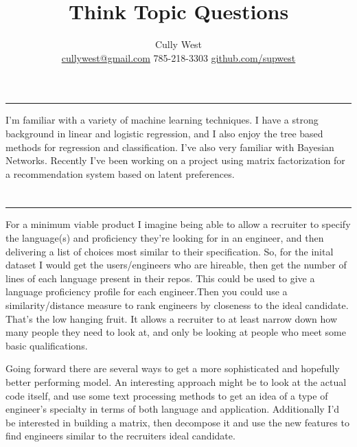 \documentclass{article}
\begin{document}
\vspace{-10pt}
\title{Think Topic Questions}
\author{{Cully West} \\ \faEnvelope \hspace{2pt} \href{cullywest@gmail.com}{cullywest@gmail.com}\hspace{2pt} \faPhone \hspace{2pt} 785-218-3303 \faGithub\hspace{2pt}\href{https://github.com/supwest}{github.com/supwest}}
\date{}
\maketitle




\section{}
\vspace{-.5em}\hrule\vspace{1em}
I'm familiar with a variety of machine learning techniques. 
I have a strong background in linear and logistic regression, and I also enjoy the tree based methods for regression and classification.
I've also very familiar with Bayesian Networks. Recently I've been working on a project using matrix factorization for a recommendation system based on latent preferences.

\section{}
\vspace{-.5em}\hrule\vspace{1em}
For a minimum viable product I imagine being able to allow a recruiter to specify the language(s) and proficiency they're looking for in an engineer, and then delivering a list of choices most similar to their specification. 
So, for the inital dataset I would get the users/engineers who are hireable, then get the number of lines of each language present in their repos.
This could be used to give a language proficiency profile for each engineer.Then you could use a similarity/distance measure to rank engineers by closeness to the ideal candidate.
That's the low hanging fruit.
It allows a recruiter to at least narrow down how many people they need to look at, and only be looking at people who meet some basic qualifications.

Going forward there are several ways to get a more sophisticated and hopefully better performing model.
An interesting approach might be to look at the actual code itself, and use some text processing methods to get an idea of a type of engineer's specialty in terms of both language and application.
Additionally I'd be interested in building a matrix, then decompose it and use the new features to find engineers similar to the recruiters ideal candidate.
\end{document}
